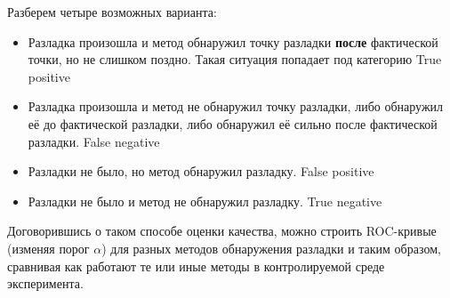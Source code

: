 \documentclass[%
12pt,
master,  %
natbib,      %
subf,        %
substylefile = spbu.rtx,
href,        %
colorlinks,  %
]{disser}
\begin{document}
Разберем четыре возможных варианта:
\begin{itemize}
	\item Разладка произошла и метод обнаружил точку разладки \textbf{после} фактической точки, но не слишком поздно. Такая ситуация попадает под категорию True positive
	\item Разладка произошла и метод не обнаружил точку разладки, либо обнаружил её до фактической разладки, либо обнаружил её сильно после фактической разладки. False negative
	\item Разладки не было, но метод обнаружил разладку. False positive
	\item Разладки не было и метод не обнаружил разладку. True negative
\end{itemize}

Договорившись о таком способе оценки качества, можно строить ROC-кривые (изменяя порог $\alpha$) для разных методов обнаружения разладки и таким образом, сравнивая как работают те или иные методы в контролируемой среде эксперимента.
\end{document}
